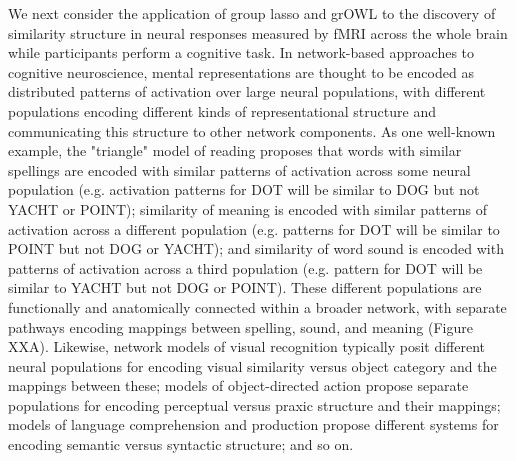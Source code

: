 We next consider the application of group lasso and grOWL to the discovery of similarity structure in neural responses measured by fMRI across the whole brain while participants perform a cognitive task. In network-based approaches to cognitive neuroscience, mental representations are thought to be encoded as distributed patterns of activation over large neural populations, with different populations encoding different kinds of representational structure and communicating this structure to other network components. As one well-known example, the "triangle" model of reading proposes that words with similar spellings are encoded with similar patterns of activation across some neural population (e.g. activation patterns for DOT will be similar to DOG but not YACHT or POINT); similarity of meaning is encoded with similar patterns of activation across a different population (e.g. patterns for DOT will be similar to POINT but not DOG or YACHT); and similarity of word sound is encoded with patterns of activation across a third population (e.g. pattern for DOT will be similar to YACHT but not DOG or POINT). These different populations are functionally and anatomically connected within a broader network, with separate pathways encoding mappings between spelling, sound, and meaning (Figure XXA). Likewise, network models of visual recognition typically posit different neural populations for encoding visual similarity versus object category and the mappings between these; models of object-directed action propose separate populations for encoding perceptual versus praxic structure and their mappings; models of language comprehension and production propose different systems for encoding semantic versus syntactic structure; and so on.


